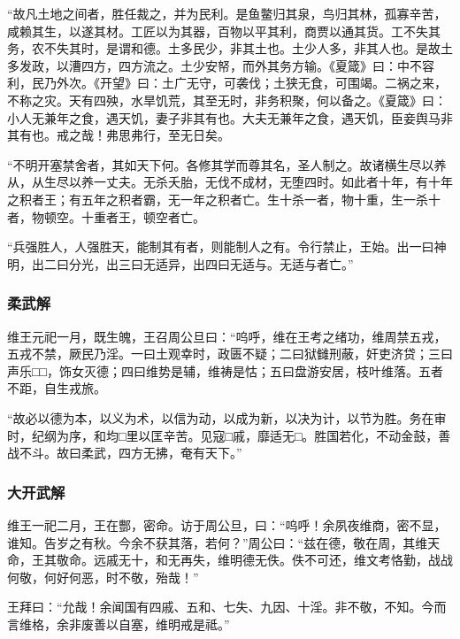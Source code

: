 \documentclass[]{article}
\begin{document}
``故凡土地之间者，胜任裁之，并为民利。是鱼鳖归其泉，鸟归其林，孤寡辛苦，咸赖其生，以遂其材。工匠以为其器，百物以平其利，商贾以通其货。工不失其务，农不失其时，是谓和德。土多民少，非其土也。土少人多，非其人也。是故土多发政，以漕四方，四方流之。土少安帑，而外其务方输。《夏箴》曰：中不容利，民乃外次。《开望》曰：土广无守，可袭伐；土狭无食，可围竭。二祸之来，不称之灾。天有四殃，水旱饥荒，其至无时，非务积聚，何以备之。《夏箴》曰：小人无兼年之食，遇天饥，妻子非其有也。大夫无兼年之食，遇天饥，臣妾舆马非其有也。戒之哉！弗思弗行，至无日矣。

``不明开塞禁舍者，其如天下何。各修其学而尊其名，圣人制之。故诸横生尽以养从，从生尽以养一丈夫。无杀夭胎，无伐不成材，无堕四时。如此者十年，有十年之积者王；有五年之积者霸，无一年之积者亡。生十杀一者，物十重，生一杀十者，物顿空。十重者王，顿空者亡。

``兵强胜人，人强胜天，能制其有者，则能制人之有。令行禁止，王始。出一曰神明，出二曰分光，出三曰无适异，出四曰无适与。无适与者亡。''

\hypertarget{header-n151}{%
\subsubsection{柔武解}\label{header-n151}}

维王元祀一月，既生魄，王召周公旦曰：``呜呼，维在王考之绪功，维周禁五戎，五戎不禁，厥民乃淫。一曰土观幸时，政匮不疑；二曰狱雠刑蔽，奸吏济贷；三曰声乐□□，饰女灭德；四曰维势是辅，维祷是怙；五曰盘游安居，枝叶维落。五者不距，自生戎旅。

``故必以德为本，以义为术，以信为动，以成为新，以决为计，以节为胜。务在审时，纪纲为序，和均□里以匡辛苦。见寇□戚，靡适无□。胜国若化，不动金鼓，善战不斗。故曰柔武，四方无拂，奄有天下。''

\hypertarget{header-n155}{%
\subsubsection{大开武解}\label{header-n155}}

维王一祀二月，王在酆，密命。访于周公旦，曰：``呜呼！余夙夜维商，密不显，谁知。告岁之有秋。今余不获其落，若何？''周公曰：``兹在德，敬在周，其维天命，王其敬命。远戚无十，和无再失，维明德无佚。佚不可还，维文考恪勤，战战何敬，何好何恶，时不敬，殆哉！''

王拜曰：``允哉！余闻国有四戚、五和、七失、九因、十淫。非不敬，不知。今而言维格，余非废善以自塞，维明戒是祗。''
\end{document}
